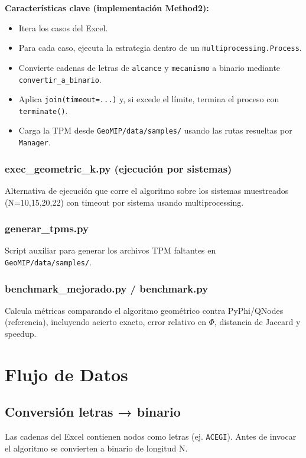 \documentclass[12pt,a4paper]{article}
\begin{document}
\textbf{Características clave (implementación Method2):}
\begin{itemize}
    \item Itera los casos del Excel.
    \item Para cada caso, ejecuta la estrategia dentro de un \texttt{multiprocessing.Process}.
    \item Convierte cadenas de letras de \texttt{alcance} y \texttt{mecanismo} a binario mediante \texttt{convertir\_a\_binario}.
    \item Aplica \texttt{join(timeout=...)} y, si excede el límite, termina el proceso con \texttt{terminate()}.
    \item Carga la TPM desde \texttt{GeoMIP/data/samples/} usando las rutas resueltas por \texttt{Manager}.
\end{itemize}

\subsubsection{exec\_geometric\_k.py (ejecución por sistemas)}
Alternativa de ejecución que corre el algoritmo sobre los sistemas muestreados (N=10,15,20,22) con timeout por sistema usando multiprocessing.

\subsubsection{generar\_tpms.py}
Script auxiliar para generar los archivos TPM faltantes en \texttt{GeoMIP/data/samples/}.

\subsubsection{benchmark\_mejorado.py / benchmark.py}
Calcula métricas comparando el algoritmo geométrico contra PyPhi/QNodes (referencia), incluyendo acierto exacto, error relativo en $\Phi$, distancia de Jaccard y speedup.

\section{Flujo de Datos}

\subsection{Conversión letras → binario}
Las cadenas del Excel contienen nodos como letras (ej. \texttt{ACEGI}). Antes de invocar el algoritmo se convierten a binario de longitud N.
\end{document}
